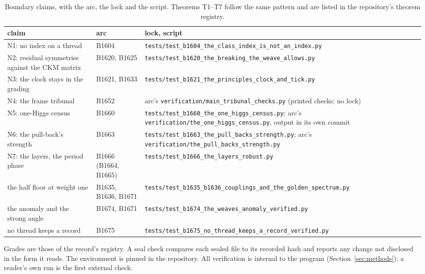 \begin{table}[h]
\centering\small
\begin{tabularx}{\linewidth}{@{}p{4.2cm}p{2.0cm}>{\raggedright\arraybackslash}X@{}}
\toprule
claim & arc & lock, script \\
\midrule
N1: no index on a thread & B1604 & \texttt{tests/test\_\allowbreak b1604\_\allowbreak the\_\allowbreak class\_\allowbreak index\_\allowbreak is\_\allowbreak not\_\allowbreak an\_\allowbreak index.py} \\
N2: residual symmetries against the CKM matrix & B1620, B1625 & \texttt{tests/test\_\allowbreak b1620\_\allowbreak the\_\allowbreak breaking\_\allowbreak the\_\allowbreak weave\_\allowbreak allows.py} \\
N3: the clock stays in the grading & B1621, B1633 & \texttt{tests/test\_\allowbreak b1621\_\allowbreak the\_\allowbreak principles\_\allowbreak clock\_\allowbreak and\_\allowbreak tick.py} \\
N4: the frame tribunal & B1652 & arc's \texttt{verification/main\_\allowbreak tribunal\_\allowbreak checks.py} (printed checks; no lock) \\
N5: one-Higgs census & B1660 & \texttt{tests/test\_\allowbreak b1660\_\allowbreak the\_\allowbreak one\_\allowbreak higgs\_\allowbreak census.py}; arc's \texttt{verification/the\_\allowbreak one\_\allowbreak higgs\_\allowbreak census.py}, output in its own commit \\
N6: the pull-back's strength & B1663 & \texttt{tests/test\_\allowbreak b1663\_\allowbreak the\_\allowbreak pull\_\allowbreak backs\_\allowbreak strength.py}; arc's \texttt{verification/the\_\allowbreak pull\_\allowbreak backs\_\allowbreak strength.py} \\
N7: the layers, the period phase & B1666 (B1664, B1665) & \texttt{tests/test\_\allowbreak b1666\_\allowbreak the\_\allowbreak layers\_\allowbreak robust.py} \\
the half floor at weight one & B1635, B1636, B1671 & \texttt{tests/test\_\allowbreak b1635\_\allowbreak b1636\_\allowbreak couplings\_\allowbreak and\_\allowbreak the\_\allowbreak golden\_\allowbreak spectrum.py} \\
the anomaly and the strong angle & B1674, B1671 & \texttt{tests/test\_\allowbreak b1674\_\allowbreak the\_\allowbreak weaves\_\allowbreak anomaly\_\allowbreak verified.py} \\
no thread keeps a record & B1675 & \texttt{tests/test\_\allowbreak b1675\_\allowbreak no\_\allowbreak thread\_\allowbreak keeps\_\allowbreak a\_\allowbreak record\_\allowbreak verified.py} \\
\bottomrule
\end{tabularx}
\caption{Boundary claims, with the arc, the lock and the script. Theorems T1--T7 follow the same pattern and are listed
in the repository's theorem registry.}\label{tab:verify}
\end{table}

Grades are those of the record's registry. A seal check compares each sealed file to its recorded hash and reports any
change not disclosed in the form it reads. The environment is pinned in the repository. All verification is internal to
the program (Section~\ref{sec:methods}); a reader's own run is the first external check.
